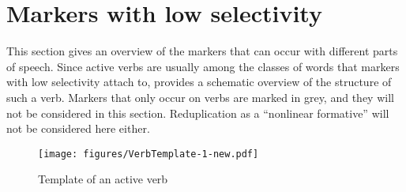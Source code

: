 
\section{Markers with low selectivity}\label{sec:LowSelectivityMarkers}

This section gives an overview of the markers that can occur with different parts of speech. Since active verbs are usually among the classes of words that markers with low selectivity attach to,  provides a schematic overview of the structure of such a verb. Markers that only occur on verbs are marked in grey, and they will not be considered in this section. Reduplication as a “nonlinear formative” \citep[183]{BickelNichols2007} will not be considered here either.

\begin{sidewaysfigure}
\centering
\texttt{[image: figures/VerbTemplate-1-new.pdf]}
\caption{Template of an active verb}
\label{fig:VerbTemplate-1}
\end{sidewaysfigure}


